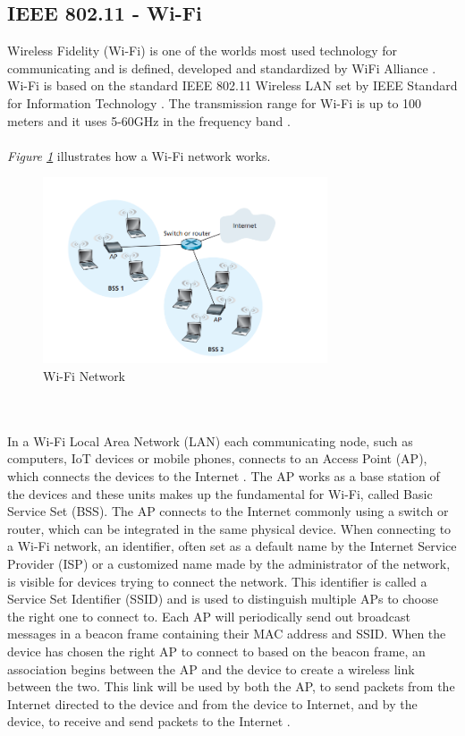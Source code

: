 \subsection{IEEE 802.11 - Wi-Fi}
Wireless Fidelity (Wi-Fi) \cite{WiFiAlliance} is one of the worlds most used technology for communicating and is defined, developed and standardized by WiFi Alliance \cite{WiFiAlliance}. Wi-Fi is based on the standard IEEE 802.11 Wireless LAN set by IEEE Standard for Information Technology \cite{WifiStandard}. The transmission range for Wi-Fi is up to 100 meters and it uses 5-60GHz in the frequency band \cite{IAQMonitorCommunicationReview}.
\\\\
\textit{Figure \ref{fig:WiFiStandard}} illustrates how a Wi-Fi network works. 
\begin{figure} [!ht]
    \centering
    \includegraphics[width=0.75\textwidth]{figures/WiFiStandard.png}
    \caption{Wi-Fi Network \cite{Datacom}}
    \label{fig:WiFiStandard}
\end{figure}
\\\\
In a Wi-Fi Local Area Network (LAN) each communicating node, such as computers, IoT devices or mobile phones, connects to an Access Point (AP), which connects the devices to the Internet \cite{Datacom}. The AP works as a base station of the devices and these units makes up the fundamental for Wi-Fi, called Basic Service Set (BSS). The AP connects to the Internet commonly using a switch or router, which can be integrated in the same physical device. When connecting to a Wi-Fi network, an identifier, often set as a default name by the Internet Service Provider (ISP) or a customized name made by the administrator of the network, is visible for devices trying to connect the network. This identifier is called a Service Set Identifier (SSID) and is used to distinguish multiple APs to choose the right one to connect to. Each AP will periodically send out broadcast messages in a beacon frame containing their MAC address and SSID. When the device has chosen the right AP to connect to based on the beacon frame, an association begins between the AP and the device to create a wireless link between the two. This link will be used by both the AP, to send packets from the Internet directed to the device and from the device to Internet, and by the device, to receive and send packets to the Internet \cite{Datacom}. 

